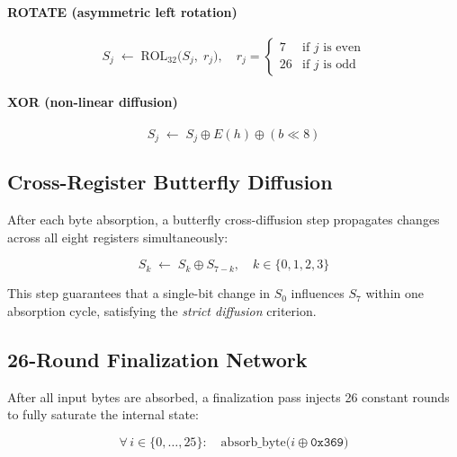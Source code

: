 \documentclass[12pt,journal]{IEEEtran}
\begin{document}
\paragraph{ROTATE (asymmetric left rotation)}
\begin{equation}
  S_j \;\leftarrow\; \mathrm{ROL}_{32}\!\bigl(S_j,\; r_j\bigr),
  \quad r_j =
  \begin{cases}
    7  & \text{if } j \text{ is even}\\
    26 & \text{if } j \text{ is odd}
  \end{cases}
  \label{eq:rotate}
\end{equation}

\paragraph{XOR (non-linear diffusion)}
\begin{equation}
  S_j \;\leftarrow\; S_j \oplus E(h) \oplus (b \ll 8)
  \label{eq:xor}
\end{equation}

\subsection{Cross-Register Butterfly Diffusion}

After each byte absorption, a butterfly cross-diffusion step propagates
changes across all eight registers simultaneously:

\begin{equation}
  S_k \;\leftarrow\; S_k \oplus S_{7-k}, \quad k \in \{0,1,2,3\}
  \label{eq:butterfly}
\end{equation}

This step guarantees that a single-bit change in $S_0$ influences $S_7$ within
one absorption cycle, satisfying the \emph{strict diffusion} criterion.

\subsection{26-Round Finalization Network}

After all input bytes are absorbed, a finalization pass injects 26 constant
rounds to fully saturate the internal state:

\begin{equation}
  \forall\, i \in \{0,\ldots,25\}:\quad
  \mathrm{absorb\_byte}\!\bigl(i \oplus \texttt{0x369}\bigr)
  \label{eq:finalization}
\end{equation}
\end{document}
